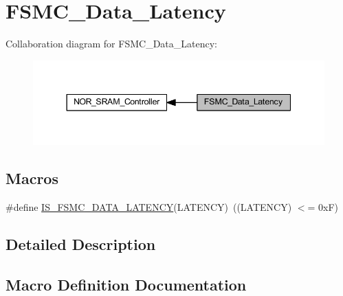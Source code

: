 \hypertarget{group___f_s_m_c___data___latency}{}\section{F\+S\+M\+C\+\_\+\+Data\+\_\+\+Latency}
\label{group___f_s_m_c___data___latency}
Collaboration diagram for F\+S\+M\+C\+\_\+\+Data\+\_\+\+Latency\+:
\nopagebreak
\begin{figure}[H]
\begin{center}
\leavevmode
\includegraphics[width=344pt]{group___f_s_m_c___data___latency}
\end{center}
\end{figure}
\subsection*{Macros}
\begin{DoxyCompactItemize}
\item 
\#define \hyperlink{group___f_s_m_c___data___latency_ga1ab8659a9631d8bb4f57d8be8580155c}{I\+S\+\_\+\+F\+S\+M\+C\+\_\+\+D\+A\+T\+A\+\_\+\+L\+A\+T\+E\+N\+CY}(L\+A\+T\+E\+N\+CY)~((L\+A\+T\+E\+N\+CY) $<$= 0x\+F)
\end{DoxyCompactItemize}


\subsection{Detailed Description}


\subsection{Macro Definition Documentation}
\mbox{\label{group___f_s_m_c___data___latency_ga1ab8659a9631d8bb4f57d8be8580155c}} 

